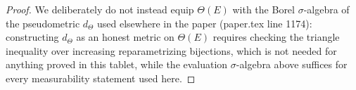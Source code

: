 \begin{proof}
  We deliberately do not instead equip $\Theta(E)$ with the Borel $\sigma$-algebra of the
  pseudometric $d_\Theta$ used elsewhere in the paper (paper.tex line 1174): constructing $d_\Theta$
  as an honest metric on $\Theta(E)$ requires checking the triangle inequality over increasing
  reparametrizing bijections, which is not needed for anything proved in this tablet, while the
  evaluation $\sigma$-algebra above suffices for every measurability statement used here.
\end{proof}
